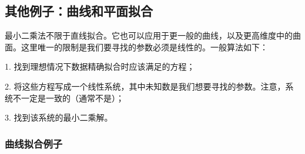 \subsection{其他例子：曲线和平面拟合}\label{sec:05-04-04}

最小二乘法不限于直线拟合。它也可以应用于更一般的曲线，以及更高维度中的曲面。这里唯一的限制是我们要寻找的参数必须是线性的。一般算法如下：

1. 找到理想情况下数据精确拟合时应该满足的方程；

2. 将这些方程写成一个线性系统，其中未知数是我们想要寻找的参数。注意，系统不一定是一致的（通常不是）；

3. 找到该系统的最小二乘解。

\subsubsection{曲线拟合例子}\label{sec:05-04-04-01}

